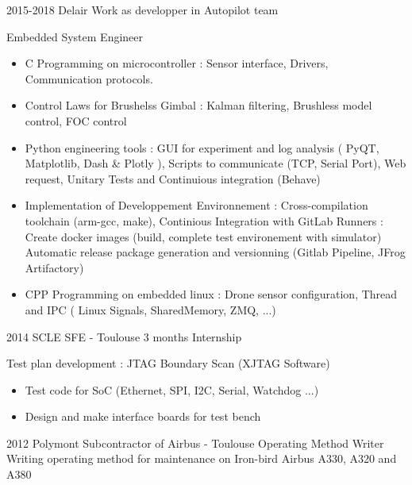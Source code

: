 \documentclass[a4paper]{friggeri-cv} %
\begin{document}
\begin{entrylist}
\entry
{2015-2018}
{Delair}
{Work as developper in Autopilot team}
{Embedded System Engineer
\begin{itemize}
\item C Programming on microcontroller : Sensor interface, Drivers, Communication protocols.
\item Control Laws for Brushelss Gimbal : Kalman filtering, Brushless model control, FOC control
\item Python engineering tools : GUI for experiment and log analysis ( PyQT, Matplotlib, Dash \& Plotly ), Scripts to communicate (TCP, Serial Port), Web request, Unitary Tests and Continuious integration (Behave)
\item Implementation of Developpement Environnement : Cross-compilation toolchain (arm-gcc, make), Continious Integration with GitLab Runners : Create docker images (build, complete test environement with simulator) Automatic release package generation and versionning (Gitlab Pipeline, JFrog Artifactory)
\item CPP Programming on embedded linux : Drone sensor configuration, Thread and IPC (  Linux Signals, SharedMemory, ZMQ, ...)
\end{itemize}
%
}
\entry
{2014}
{SCLE SFE - Toulouse}
{3 months Internship}
{Test plan development : JTAG Boundary Scan (XJTAG Software)
\begin{itemize}
\item Test code for SoC (Ethernet, SPI, I2C, Serial, Watchdog ...)
\item Design and make interface boards for test bench
\end{itemize}
}

\entry
{2012}
{Polymont Subcontractor of Airbus - Toulouse}
{Operating Method Writer}
{ Writing operating method for maintenance on Iron-bird Airbus A330, A320 and A380 }




\end{entrylist}
\end{document}
